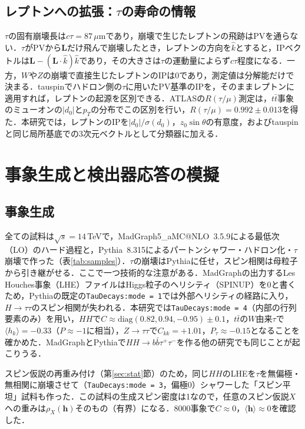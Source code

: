 \documentclass[paper=a4,fontsize=10pt,jafontsize=10pt,line_length=44zw,number_of_lines=46]{jlreq}
\newcommand{\bbtt}{b\bar b\tau^+\tau^-}
\newcommand{\hvec}{\boldsymbol{h}}
\begin{document}
\subsection{レプトンへの拡張：$\tau$の寿命の情報}

$\tau$の固有崩壊長は$c\tau=87\,\mu$mであり，崩壊で生じたレプトンの飛跡はPVを通らない．$\tau$がPVから$\boldsymbol L$だけ飛んで崩壊したとき，レプトンの方向を$\hat k$とすると，IPベクトルは$\boldsymbol L-(\boldsymbol L\cdot\hat k)\hat k$であり，その大きさは$\tau$の運動量によらず$c\tau$程度になる．一方，$W$や$Z$の崩壊で直接生じたレプトンのIPは0であり，測定値は分解能だけで決まる．tauspinでハドロン側の$\tau$に用いたPV基準のIPを，そのままレプトンに適用すれば，レプトンの起源を区別できる．ATLASの$R(\tau/\mu)$測定\cite{ATLAS:2020xea}は，$t\bar t$事象のミューオンの$|d_0|$と$p_T$の分布でこの区別を行い，$R(\tau/\mu)=0.992\pm0.013$を得た．本研究では，レプトンのIPを$|d_0|/\sigma(d_0)$，$z_0\sin\theta$の有意度，およびtauspinと同じ局所基底での3次元ベクトルとして分類器に加える．

\section{事象生成と検出器応答の模擬}\label{sec:sim}

\subsection{事象生成}

全ての試料は$\sqrt s=14$\,TeVで，MadGraph5\_aMC@NLO~3.5.9\cite{Alwall:2014hca}による最低次（LO）のハード過程と，Pythia~8.315\cite{Bierlich:2022pfr}によるパートンシャワー・ハドロン化・$\tau$崩壊で作った（表\ref{tab:samples}）．$\tau$の崩壊はPythiaに任せ，スピン相関は母粒子から引き継がせる．ここで一つ技術的な注意がある．MadGraphの出力するLes Houches事象（LHE）ファイルはHiggs粒子のヘリシティ（SPINUP）を0と書くため，Pythiaの既定の\texttt{TauDecays:mode = 1}では外部ヘリシティの経路に入り，$H\to\tau\tau$のスピン相関が失われる．本研究では\texttt{TauDecays:mode = 4}（内部の行列要素のみ）を用い，$HH$で$C\approx\mathrm{diag}(0.82,0.94,-0.95)\pm0.1$，$t\bar t$の$W$由来$\tau$で$\langle h_k\rangle=-0.33$（$P\approx-1$に相当），$Z\to\tau\tau$で$C_{kk}=+1.01$，$P_\tau\approx-0.15$となることを確かめた．MadGraphとPythiaで$HH\to\bbtt$を作る他の研究でも同じことが起こりうる．

スピン仮説の再重み付け（第\ref{sec:stat}節）のため，同じ$HH$のLHEを$\tau$を無偏極・無相関に崩壊させて（\texttt{TauDecays:mode = 3}，偏極0）シャワーした「スピン平坦」試料も作った．この試料の生成スピン密度は1なので，任意のスピン仮説$X$への重みは$\rho_X(\hvec)$そのもの（有界）になる．$8000$事象で$C\approx0$，$\langle\hvec\rangle\approx0$を確認した．
\end{document}
